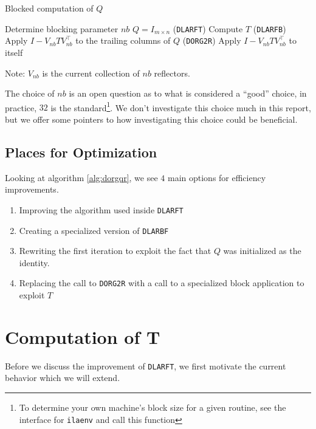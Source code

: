 \documentclass[12pt]{article}
\begin{document}
    \begin{algorithm}
        \caption{Blocked computation of $Q$}\label{alg:dorgqr}
        \begin{algorithmic}[1]
            \STATE Determine blocking parameter $nb$
            \STATE $Q = I_{m\times n}$
                \STATE (\verb|DLARFT|) Compute $T$
                \STATE (\verb|DLARFB|) Apply $I-V_{nb}TV_{nb}^\top$ to the trailing columns of $Q$
                \STATE (\verb|DORG2R|) Apply $I-V_{nb}TV_{nb}^\top$ to itself
            \ENDFOR
        \end{algorithmic}
    \end{algorithm}

    Note: $V_{nb}$ is the current collection of $nb$ reflectors.

    The choice of $nb$ is an open question as to what is considered a ``good'' choice, in practice, $32$ is 
    the standard\footnote{To determine your own machine's block size for a given routine, see the interface for 
    \verb+ilaenv+ and call this function}. We don't investigate this choice much in this report, but we offer 
    some pointers to how investigating this choice could be beneficial.
    \subsection{Places for Optimization}
    Looking at algorithm \ref{alg:dorgqr}, we see $4$ main options for efficiency improvements. 
    \begin{enumerate}
        \item Improving the algorithm used inside \verb|DLARFT|
        \item Creating a specialized version of \verb|DLARBF|
        \item Rewriting the first iteration to exploit the fact that $Q$ was initialized as the identity.
        \item Replacing the call to \verb|DORG2R| with a call to a specialized block application to exploit $T$
    \end{enumerate}
    \section{Computation of T}
    Before we discuss the improvement of \verb|DLARFT|, we first motivate the current behavior which we will
    extend.
    
\end{document}
